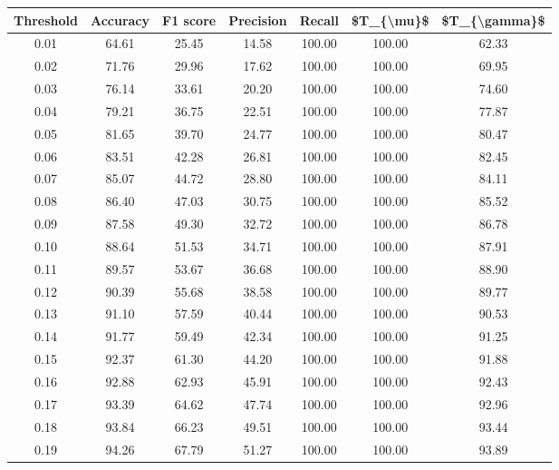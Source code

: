 \begin{tabular}{|c|c|c|c|c|c|c|}
\hline
 Threshold &  Accuracy &  F1 score &  Precision &  Recall &  \$T\_\{\textbackslash mu\}\$ &  \$T\_\{\textbackslash gamma\}\$ \\
\hline
      0.01 &     64.61 &     25.45 &      14.58 &  100.00 &     100.00 &         62.33 \\
      0.02 &     71.76 &     29.96 &      17.62 &  100.00 &     100.00 &         69.95 \\
      0.03 &     76.14 &     33.61 &      20.20 &  100.00 &     100.00 &         74.60 \\
      0.04 &     79.21 &     36.75 &      22.51 &  100.00 &     100.00 &         77.87 \\
      0.05 &     81.65 &     39.70 &      24.77 &  100.00 &     100.00 &         80.47 \\
      0.06 &     83.51 &     42.28 &      26.81 &  100.00 &     100.00 &         82.45 \\
      0.07 &     85.07 &     44.72 &      28.80 &  100.00 &     100.00 &         84.11 \\
      0.08 &     86.40 &     47.03 &      30.75 &  100.00 &     100.00 &         85.52 \\
      0.09 &     87.58 &     49.30 &      32.72 &  100.00 &     100.00 &         86.78 \\
      0.10 &     88.64 &     51.53 &      34.71 &  100.00 &     100.00 &         87.91 \\
      0.11 &     89.57 &     53.67 &      36.68 &  100.00 &     100.00 &         88.90 \\
      0.12 &     90.39 &     55.68 &      38.58 &  100.00 &     100.00 &         89.77 \\
      0.13 &     91.10 &     57.59 &      40.44 &  100.00 &     100.00 &         90.53 \\
      0.14 &     91.77 &     59.49 &      42.34 &  100.00 &     100.00 &         91.25 \\
      0.15 &     92.37 &     61.30 &      44.20 &  100.00 &     100.00 &         91.88 \\
      0.16 &     92.88 &     62.93 &      45.91 &  100.00 &     100.00 &         92.43 \\
      0.17 &     93.39 &     64.62 &      47.74 &  100.00 &     100.00 &         92.96 \\
      0.18 &     93.84 &     66.23 &      49.51 &  100.00 &     100.00 &         93.44 \\
      0.19 &     94.26 &     67.79 &      51.27 &  100.00 &     100.00 &         93.89 \\

\end{tabular}
